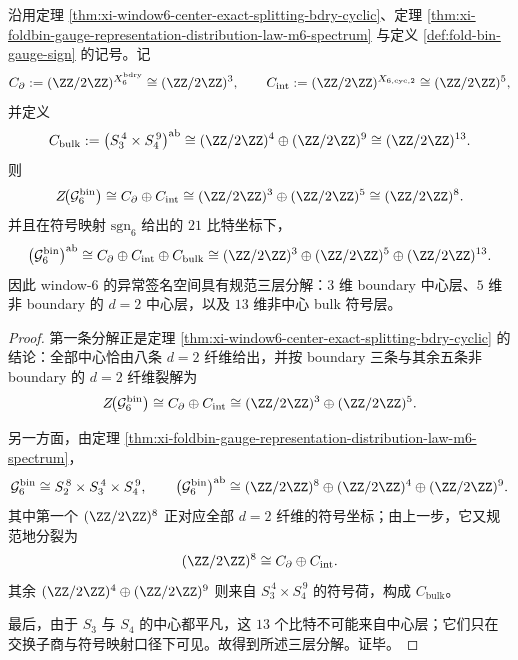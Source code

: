 \begin{theorem}\label{thm:xi-window6-anomaly-signature-three-layer-splitting}
沿用定理 \ref{thm:xi-window6-center-exact-splitting-bdry-cyclic}、定理
\ref{thm:xi-foldbin-gauge-representation-distribution-law-m6-spectrum} 与定义
\ref{def:fold-bin-gauge-sign} 的记号。记
\[
C_{\partial}:=(\ZZ/2\ZZ)^{X_6^{\mathrm{bdry}}}\cong(\ZZ/2\ZZ)^3,
\qquad
C_{\mathrm{int}}:=(\ZZ/2\ZZ)^{X_{6,\mathrm{cyc},2}}\cong(\ZZ/2\ZZ)^5,
\]
并定义
\[
C_{\mathrm{bulk}}
:=
\bigl(S_3^{\,4}\times S_4^{\,9}\bigr)^{\mathrm{ab}}
\cong
(\ZZ/2\ZZ)^4\oplus(\ZZ/2\ZZ)^9
\cong
(\ZZ/2\ZZ)^{13}.
\]
则
\[
Z\!\bigl(\mathcal G_6^{\mathrm{bin}}\bigr)
\cong
C_{\partial}\oplus C_{\mathrm{int}}
\cong
(\ZZ/2\ZZ)^3\oplus(\ZZ/2\ZZ)^5
\cong
(\ZZ/2\ZZ)^8.
\]
并且在符号映射 \(\mathrm{sgn}_6\) 给出的 \(21\) 比特坐标下，
\[
\bigl(\mathcal G_6^{\mathrm{bin}}\bigr)^{\mathrm{ab}}
\cong
C_{\partial}\oplus C_{\mathrm{int}}\oplus C_{\mathrm{bulk}}
\cong
(\ZZ/2\ZZ)^3\oplus(\ZZ/2\ZZ)^5\oplus(\ZZ/2\ZZ)^{13}.
\]
因此 window-\(6\) 的异常签名空间具有规范三层分解：\(3\) 维 boundary 中心层、\(5\) 维非 boundary 的
\(d=2\) 中心层，以及 \(13\) 维非中心 bulk 符号层。
\end{theorem}
\begin{proof}
第一条分解正是定理 \ref{thm:xi-window6-center-exact-splitting-bdry-cyclic} 的结论：全部中心恰由八条
\(d=2\) 纤维给出，并按 boundary 三条与其余五条非 boundary 的 \(d=2\) 纤维裂解为
\[
Z\!\bigl(\mathcal G_6^{\mathrm{bin}}\bigr)
\cong
C_{\partial}\oplus C_{\mathrm{int}}
\cong
(\ZZ/2\ZZ)^3\oplus(\ZZ/2\ZZ)^5.
\]

另一方面，由定理 \ref{thm:xi-foldbin-gauge-representation-distribution-law-m6-spectrum}，
\[
\mathcal G_6^{\mathrm{bin}}
\cong
S_2^{\,8}\times S_3^{\,4}\times S_4^{\,9},
\qquad
\bigl(\mathcal G_6^{\mathrm{bin}}\bigr)^{\mathrm{ab}}
\cong
(\ZZ/2\ZZ)^8\oplus(\ZZ/2\ZZ)^4\oplus(\ZZ/2\ZZ)^9.
\]
其中第一个 \((\ZZ/2\ZZ)^8\) 正对应全部 \(d=2\) 纤维的符号坐标；由上一步，它又规范地分裂为
\[
(\ZZ/2\ZZ)^8\cong C_{\partial}\oplus C_{\mathrm{int}}.
\]
其余 \((\ZZ/2\ZZ)^4\oplus(\ZZ/2\ZZ)^9\) 则来自 \(S_3^{\,4}\times S_4^{\,9}\) 的符号荷，构成
\(C_{\mathrm{bulk}}\)。

最后，由于 \(S_3\) 与 \(S_4\) 的中心都平凡，这 \(13\) 个比特不可能来自中心层；它们只在交换子商与符号映射口径下可见。故得到所述三层分解。证毕。
\end{proof}

